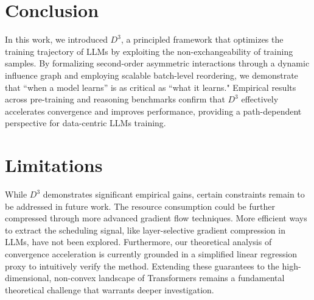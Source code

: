 \vspace{-1mm}
\section{Conclusion}
In this work, we introduced $D^3$, a principled framework that optimizes the training trajectory of LLMs by exploiting the non-exchangeability of training samples. By formalizing second-order asymmetric interactions through a dynamic influence graph and employing scalable batch-level reordering, we demonstrate that ``when a model learns'' is as critical as ``what it learns." Empirical results across pre-training and reasoning benchmarks confirm that $D^3$ effectively accelerates convergence and improves performance, providing a path-dependent perspective for data-centric LLMs training.

\vspace{-1mm}
\section*{Limitations}
While $D^3$ demonstrates significant empirical gains, certain constraints remain to be addressed in future work. The resource consumption could be further compressed through more advanced gradient flow techniques. More efficient ways to extract the scheduling signal, like layer-selective gradient compression in LLMs, have not been explored. Furthermore, our theoretical analysis of convergence acceleration is currently grounded in a simplified linear regression proxy to intuitively verify the method. Extending these guarantees to the high-dimensional, non-convex landscape of Transformers remains a fundamental theoretical challenge that warrants deeper investigation. 